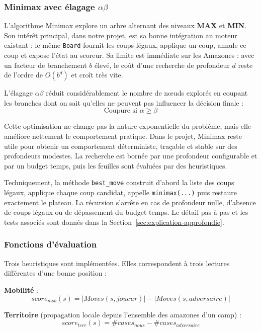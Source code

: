 \documentclass[a4paper]{article}
\begin{document}
\subsubsection{Minimax avec élagage \texorpdfstring{$\alpha\beta$}{alpha-beta}}

L'algorithme Minimax \cite{knuth1975} explore un arbre alternant des niveaux \textbf{MAX} et \textbf{MIN}. Son intérêt principal, dans notre projet, est sa bonne intégration au moteur existant : le même \texttt{Board} fournit les coups légaux, applique un coup, annule ce coup et expose l'état au scoreur. Sa limite est immédiate sur les Amazones : avec un facteur de branchement $b$ élevé, le coût d'une recherche de profondeur $d$ reste de l'ordre de $O(b^d)$ et croît très vite.

L'élagage $\alpha\beta$ réduit considérablement le nombre de nœuds explorés en coupant les branches dont on sait qu'elles ne peuvent pas influencer la décision finale :
\[
\text{Coupure si } \alpha \geq \beta
\]

Cette optimisation ne change pas la nature exponentielle du problème, mais elle améliore nettement le comportement pratique. Dans le projet, Minimax reste utile pour obtenir un comportement déterministe, traçable et stable sur des profondeurs modestes. La recherche est bornée par une profondeur configurable et par un budget temps, puis les feuilles sont évaluées par des heuristiques.

Techniquement, la méthode \texttt{best\_move} construit d'abord la liste des coups légaux, applique chaque coup candidat, appelle \texttt{minimax(...)} puis restaure exactement le plateau. La récursion s'arrête en cas de profondeur nulle, d'absence de coups légaux ou de dépassement du budget temps. Le détail pas à pas et les tests associés sont donnés dans la Section~\ref{sec:explication-approfondie}.

\subsubsection{Fonctions d'évaluation}

Trois heuristiques sont implémentées. Elles correspondent à trois lectures différentes d'une bonne position :

\textbf{Mobilité} \cite{muller2002} :
\[
score_{mob}(s) = |Moves(s, joueur)| - |Moves(s, adversaire)|
\]

\textbf{Territoire} \cite{lieberum1999} (propagation locale depuis l'ensemble des amazones d'un camp) :
\[
score_{terr}(s) = \#cases_{nous} - \#cases_{adversaire}
\]
\end{document}
